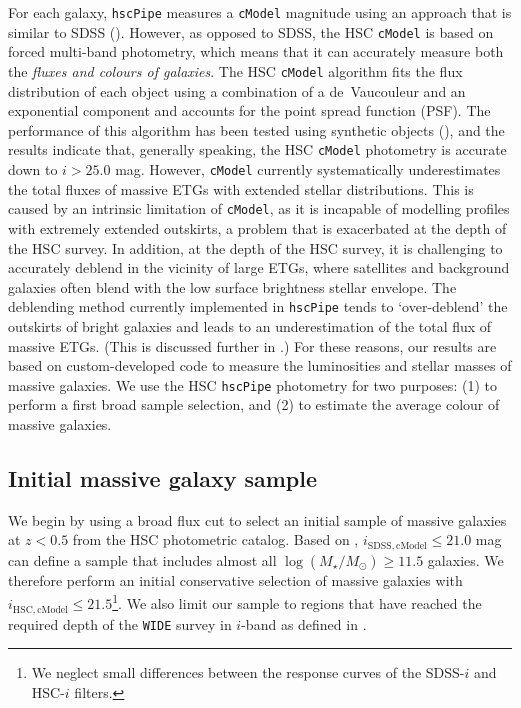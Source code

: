 \documentclass[fleqn,usenatbib]{mnras}
\def\cmodel{\texttt{cModel}}
\def\logms{{$\log (M_{\star}/M_{\odot})$}}
\begin{document}
    For each galaxy, \texttt{hscPipe} measures a \cmodel{} magnitude using an approach 
    that is similar to SDSS (\citealt{HSC-PIPE}). 
    However, as opposed to SDSS, the HSC \cmodel{} is based on forced multi-band 
    photometry, which means that it can accurately measure both the 
    \textit{fluxes and colours of galaxies}. 
    The HSC \cmodel{} algorithm fits the flux distribution of each object using a 
    combination of a de~Vaucouleur and an exponential component and accounts for the 
    point spread function (PSF). 
    The performance of this algorithm has been tested using synthetic objects 
    (\citealt{SynPipe}), and the results indicate that, generally speaking, 
    the HSC \cmodel{} photometry is accurate down to $i >25.0$ mag.  
    However, \cmodel{} currently systematically underestimates the total fluxes of 
    massive ETGs with extended stellar distributions. 
    This is caused by an intrinsic limitation of \cmodel{}, as it is incapable of
    modelling profiles with extremely extended outskirts, a problem that is exacerbated 
    at the depth of the HSC survey. 
    In addition, at the depth of the HSC survey, it is challenging to accurately 
    deblend in the vicinity of large ETGs, where satellites and background galaxies 
    often blend with the low surface brightness stellar envelope. 
    The deblending method currently implemented in \texttt{hscPipe} tends to 
    `over-deblend' the outskirts of bright galaxies and leads to an 
    underestimation of the total flux of massive ETGs. (This is discussed further in 
    \citealt{HSC-PIPE}.)   
    For these reasons, our results are based on custom-developed code to measure 
    the luminosities and stellar masses of massive galaxies. 
    We use the HSC \texttt{hscPipe} photometry for two purposes: 
    (1) to perform a first broad sample selection, and (2) to estimate the average 
    colour of massive galaxies.

\subsection{Initial massive galaxy sample}
    \label{ssec:initial}
    
    We begin by using a broad flux cut to select an initial sample of massive 
    galaxies at $z < 0.5$ from the HSC photometric catalog. 
    Based on \citet{Leauthaud2016}, $i_{\mathrm{SDSS, cModel}} \leq 21.0$ mag can 
    define a sample that includes almost all \logms{}$\geq 11.5$ galaxies.    
    We therefore perform an initial conservative selection of massive galaxies
    with $i_{\mathrm{HSC, cModel}} \leq 21.5$\footnote{We neglect small differences
    between the response curves of the SDSS-$i$ and HSC-$i$ filters.}. 
    We also limit our sample to regions that have reached the required depth of 
    the \texttt{WIDE} survey in $i$-band as defined in \citet{HSC-DR1}.
    
\end{document}
